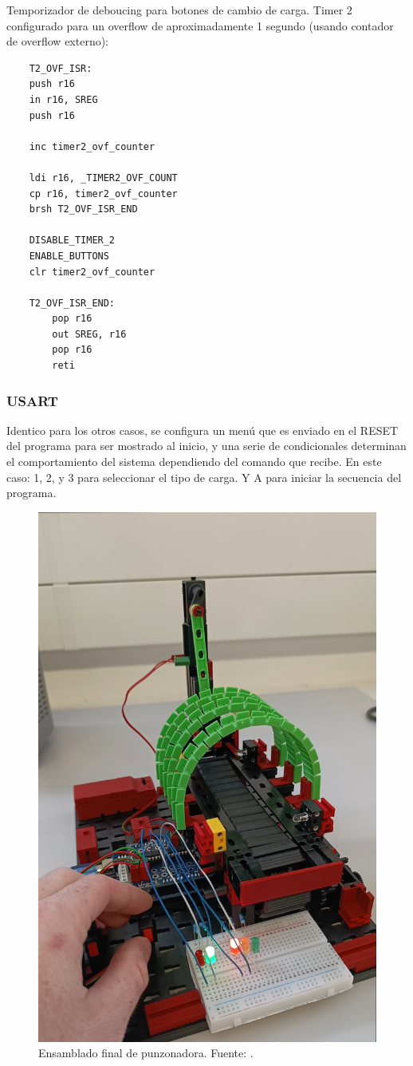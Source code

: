 Temporizador de deboucing para botones de cambio de carga. Timer 2 configurado para un overflow de aproximadamente 1 segundo (usando contador de overflow externo):

\begin{verbatim}
    T2_OVF_ISR:
	push r16 
    in r16, SREG 
	push r16 
	
	inc timer2_ovf_counter
	
	ldi r16, _TIMER2_OVF_COUNT 
    cp r16, timer2_ovf_counter 
    brsh T2_OVF_ISR_END 
    
	DISABLE_TIMER_2
	ENABLE_BUTTONS
	clr timer2_ovf_counter
    
    T2_OVF_ISR_END:
		pop r16
		out SREG, r16
		pop r16	
		reti

\end{verbatim}

\subsubsection{USART}
Identico para los otros casos, se configura un menú que es enviado en el RESET del programa para ser mostrado al inicio, y una serie de condicionales determinan el comportamiento del sistema dependiendo del comando que recibe. En este caso: 1, 2, y 3 para seleccionar el tipo de carga. Y A para iniciar la secuencia del programa.


\begin{figure}[H]
  \centering
  \includegraphics[width=0.7\linewidth]{./Anexos/Resultados/Punzonadora/Circuito.jpg}
  \caption{Ensamblado final de punzonadora. Fuente: \cite{LabDrive}.}
  \label{fig:punzonadora_circuito}
\end{figure}


